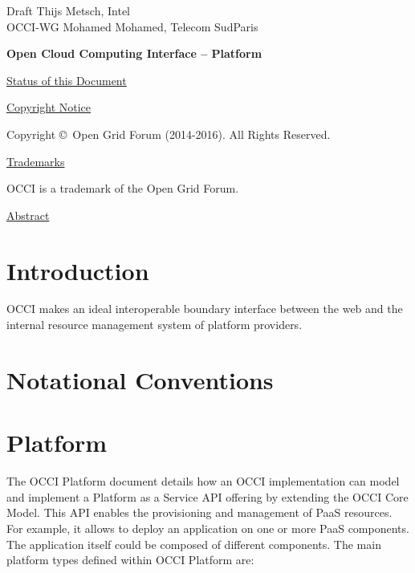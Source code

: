 \documentclass[10pt,a4paper]{article}
\begin{document}
\thispagestyle{empty}

Draft \hfill  Thijs Metsch, Intel\\
OCCI-WG \hfill  Mohamed Mohamed, Telecom SudParis\\
\rightline {\today}

\vspace*{0.5in}

\begin{Large}
\textbf{Open Cloud Computing Interface -- Platform}
\end{Large}

\vspace*{0.5in}

\underline{Status of this Document}



\underline{Copyright Notice}

Copyright \copyright ~Open Grid Forum (2014-2016). All Rights
Reserved.

\underline{Trademarks}

OCCI is a trademark of the Open Grid Forum.

\underline{Abstract}



\newpage
\tableofcontents
\newpage

\section{Introduction}


OCCI makes an ideal interoperable boundary interface between the web
and the internal resource management system of platform providers.

\section{Notational Conventions}



\section{Platform}

The OCCI Platform document details how an OCCI implementation can model and implement a Platform as a Service API offering by extending the OCCI Core Model. This API enables the provisioning and management of PaaS resources. For example, it allows to deploy an application on one or more PaaS components. The application itself could be composed of different components. The main platform types defined within OCCI Platform are:
\end{document}
